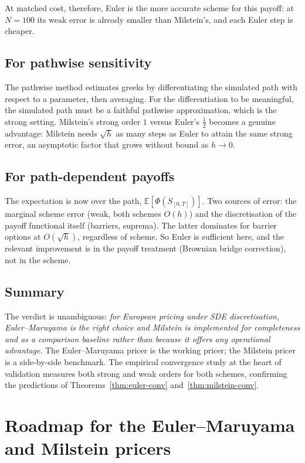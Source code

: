 \documentclass[11pt,a4paper]{article}
\theoremstyle{plain}
\theoremstyle{definition}
\theoremstyle{remark}
\newcommand{\E}{\mathbb{E}}
\begin{document}
At matched cost, therefore, Euler is the more accurate scheme for this
payoff: at $N = 100$ its weak error is already smaller than Milstein's,
and each Euler step is cheaper.

\subsection{For pathwise sensitivity}

The pathwise method estimates greeks by differentiating the simulated
path with respect to a parameter, then averaging. For the
differentiation to be meaningful, the simulated path must be a
faithful pathwise approximation, which is the strong setting.
Milstein's strong order $1$ versus Euler's $\tfrac{1}{2}$ becomes a
genuine advantage: Milstein needs $\sqrt{h}$ as many steps as Euler
to attain the same strong error, an asymptotic factor that grows
without bound as $h \to 0$.

\subsection{For path-dependent payoffs}

The expectation is now over the path, $\E[\Phi(S_{[0,T]})]$. Two
sources of error: the marginal scheme error (weak, both schemes
$O(h)$) and the discretisation of the payoff functional itself
(barriers, suprema). The latter dominates for barrier options at
$O(\sqrt{h})$, regardless of scheme. So Euler is sufficient here,
and the relevant improvement is in the payoff treatment (Brownian
bridge correction), not in the scheme.

\subsection{Summary}

The verdict is unambiguous: \emph{for European pricing under
SDE discretisation, Euler--Maruyama is the right choice and Milstein is
implemented for completeness and as a comparison baseline rather than
because it offers any operational advantage}. The Euler--Maruyama pricer
is the working pricer; the Milstein pricer is
a side-by-side benchmark. The empirical convergence
study at the heart of validation measures both strong and weak
orders for both schemes, confirming the predictions of
Theorems~\ref{thm:euler-conv} and~\ref{thm:milstein-conv}.

\section{Roadmap for the Euler--Maruyama and Milstein pricers}
\label{sec:roadmap}
\end{document}

